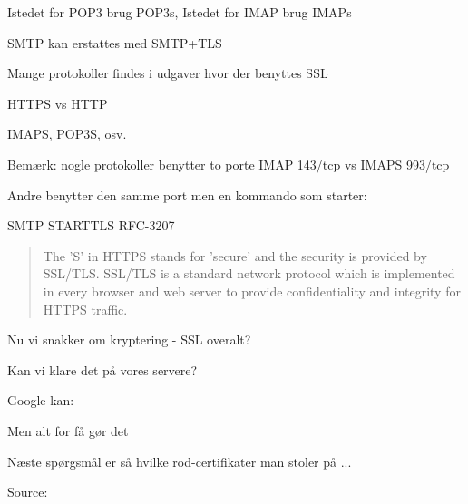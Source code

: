 \documentclass[20pt,landscape,a4paper,footrule]{foils}
\begin{document}

\centerline{Istedet for POP3 brug POP3s, Istedet for IMAP brug IMAPs}




\centerline{SMTP kan erstattes med SMTP+TLS}



\begin{list1}
\item Mange protokoller findes i udgaver hvor der benyttes SSL
\item HTTPS vs HTTP
\item IMAPS, POP3S, osv.
\item Bemærk: nogle protokoller benytter to porte IMAP 143/tcp vs IMAPS 993/tcp
\item Andre benytter den samme port men en kommando som starter:
\item SMTP STARTTLS RFC-3207
\end{list1}



\begin{quote}
The 'S' in HTTPS stands for 'secure' and the security is provided by SSL/TLS. SSL/TLS is a standard network protocol which is implemented in every browser and web server to provide confidentiality and integrity for HTTPS traffic.
\end{quote}

\begin{list1}
\item Nu vi snakker om kryptering - SSL overalt?
\item Kan vi klare det på vores servere?
\pause
\item Google kan:\\
\item Men alt for få gør det
\end{list1}
\pause
\centerline{Næste spørgsmål er så hvilke rod-certifikater man stoler på ...}





Source: 

\end{document}
